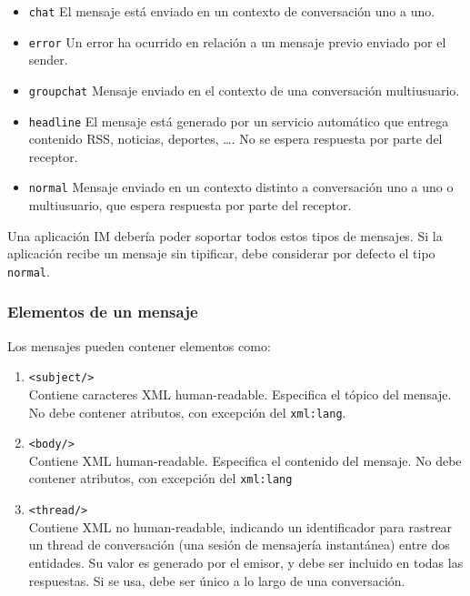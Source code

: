 \documentclass[a4paper, 11pt]{article} %
\begin{document}
      \begin{itemize}
	\item \texttt{chat} El mensaje está enviado en un contexto de conversación uno a uno.
	\item \texttt{error} Un error ha ocurrido en relación a un mensaje previo enviado por el sender.
	\item \texttt{groupchat} Mensaje enviado en el contexto de una conversación multiusuario.
	\item \texttt{headline} El mensaje está generado por un servicio automático que entrega contenido RSS, noticias, 
	  deportes, \ldots. No se espera respuesta por parte del receptor.
	\item \texttt{normal} Mensaje enviado en un contexto distinto a conversación uno a uno o multiusuario, que espera
	  respuesta por parte del receptor.
      \end{itemize}
      
      Una aplicación IM debería poder soportar todos estos tipos de mensajes. Si la aplicación recibe un mensaje sin tipificar,
      debe considerar por defecto el tipo \texttt{normal}.
    
    \subsubsection{Elementos de un mensaje}
      Los mensajes pueden contener elementos como:
      \begin{enumerate}
	\item \texttt{<subject/>}\\
	Contiene caracteres XML human-readable. Especifica el tópico del mensaje. No debe contener atributos, con excepción
	del \texttt{xml:lang}.
	
	\item \texttt{<body/>}\\
	Contiene XML human-readable. Especifica el contenido del mensaje. No debe contener atributos, con excepción
	del \texttt{xml:lang}
	
	\item \texttt{<thread/>}\\
	Contiene XML no human-readable, indicando un identificador para rastrear un thread de conversación (una sesión de
	mensajería instantánea) entre dos entidades. Su valor es generado por el emisor, y debe ser incluido en todas 
	las respuestas. Si se usa, debe ser único a lo largo de una conversación.
      \end{enumerate}
\end{document}
